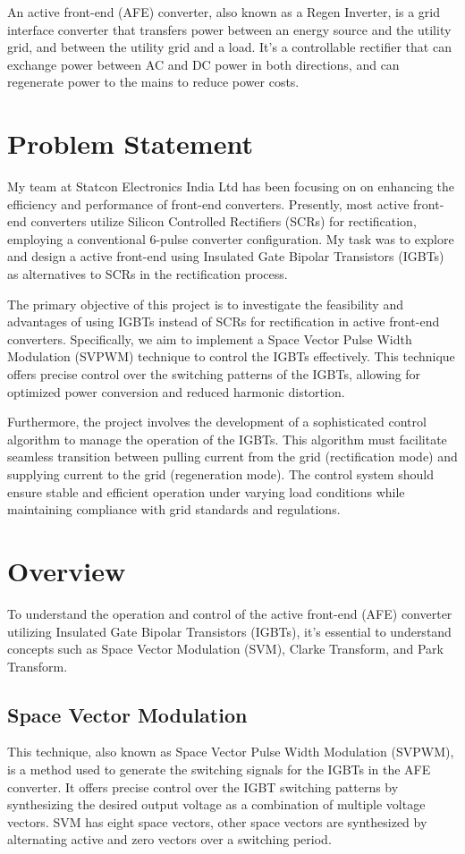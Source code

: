 An active front-end (AFE) converter, also known as a Regen Inverter, is a grid
interface converter that transfers power between an energy source and the
utility grid, and between the utility grid and a load. It's a controllable
rectifier that can exchange power between AC and DC power in both directions,
and can regenerate power to the mains to reduce power costs.
\section{Problem Statement}
My team at Statcon Electronics India Ltd has been focusing on on enhancing the
efficiency and performance of front-end converters. Presently, most active
front-end converters utilize Silicon Controlled Rectifiers (SCRs) for
rectification, employing a conventional 6-pulse converter configuration. My
task was to explore and design a active front-end using Insulated Gate Bipolar
Transistors (IGBTs) as alternatives to SCRs in the rectification process.

The primary objective of this project is to investigate the feasibility and
advantages of using IGBTs instead of SCRs for rectification in active front-end
converters. Specifically, we aim to implement a Space Vector Pulse Width
Modulation (SVPWM) technique to control the IGBTs effectively. This technique
offers precise control over the switching patterns of the IGBTs, allowing for
optimized power conversion and reduced harmonic distortion.

Furthermore, the project involves the development of a sophisticated control
algorithm to manage the operation of the IGBTs. This algorithm must facilitate
seamless transition between pulling current from the grid (rectification mode)
and supplying current to the grid (regeneration mode). The control system
should ensure stable and efficient operation under varying load conditions
while maintaining compliance with grid standards and regulations.

\section{Overview}
To understand the operation and control of the active front-end (AFE) converter
utilizing Insulated Gate Bipolar Transistors (IGBTs), it's essential to
understand concepts such as Space Vector Modulation (SVM), Clarke Transform,
and Park Transform.

\subsection{Space Vector Modulation}
This technique, also known as Space Vector Pulse Width Modulation (SVPWM), is a
method used to generate the switching signals for the IGBTs in the AFE
converter. It offers precise control over the IGBT switching patterns by
synthesizing the desired output voltage as a combination of multiple voltage
vectors. SVM has eight space vectors, other space vectors are synthesized by
alternating active and zero vectors over a switching period.

